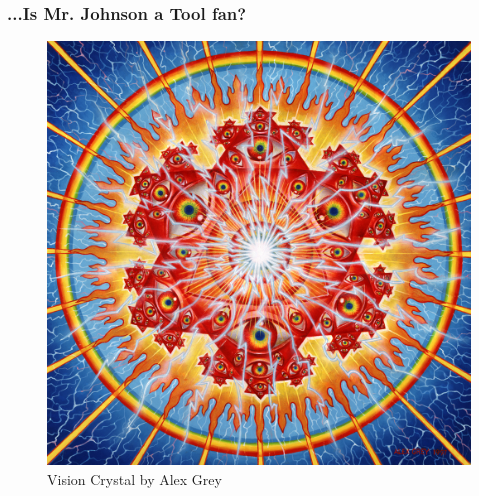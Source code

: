 \documentclass{beamer}
\theoremstyle{mystyle}
\begin{document}

\begin{frame}
\frametitle{...Is Mr. Johnson a Tool fan?}

\begin{center}
	\begin{figure}
		\includegraphics[scale=0.15]{lateralus.jpg}
		\caption{Vision Crystal by Alex Grey}
	\end{figure}
\end{center}

\end{frame}
\end{document}
